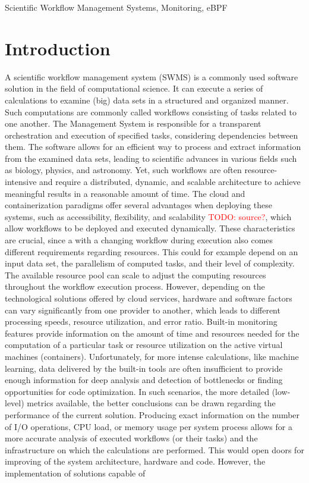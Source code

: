 \documentclass[a4paper,journal]{IEEEtran}
\newcommand{\todo}[1]{\textcolor{red}{TODO: #1}\PackageWarning{TODO:}{#1!}}
\begin{document}
	\begin{IEEEkeywords}
		Scientific Workflow Management Systems, Monitoring, eBPF
	\end{IEEEkeywords}
	
	
	\section{Introduction}
	A scientific workflow management system (SWMS) is a commonly used software solution in the field of computational science. It can execute a series of calculations to examine (big) data sets in a structured and organized manner. Such computations are commonly called workflows consisting of tasks related to one another. The Management System is responsible for a transparent orchestration and execution of specified tasks, considering dependencies between them. The software allows for an efficient way to process and extract information from the examined data sets, leading to scientific advances in various fields such as biology, physics, and astronomy\cite{gil2007examiningchallengesscientific}. Yet, such workflows are often resource-intensive and require a distributed, dynamic, and scalable architecture to achieve meaningful results in a reasonable amount of time. The cloud and containerization paradigms offer several advantages when deploying these systems, such as accessibility, flexibility, and scalability \todo{source?}, which allow workflows to be deployed and executed dynamically. These characteristics are crucial, since a with a changing workflow during execution also comes different requirements regarding resources. This could for example depend on an input data set, the parallelism of computed tasks, and their level of complexity. The available resource pool can scale to adjust the computing resources throughout the workflow execution process. However, depending on the technological solutions offered by cloud services, hardware and software factors can vary significantly from one provider to another, which leads to different processing speeds, resource utilization, and error ratio\cite{aljamal2018comparativereviewhighperformance}. Built-in monitoring features provide information on the amount of time and resources needed for the computation of a particular task or resource utilization on the active virtual machines (containers). Unfortunately, for more intense calculations, like machine learning, data delivered by the built-in tools are often insufficient to provide enough information for deep analysis and detection of bottlenecks or finding opportunities for code optimization. In such scenarios, the more detailed (low-level) metrics available, the better conclusions can be drawn regarding the performance of the current solution. Producing exact information on the number of I/O operations, CPU load, or memory usage per system process allows for a more accurate analysis of executed workflows (or their tasks) and the infrastructure on which the calculations are performed. This would open doors for improving of the system architecture, hardware and code. However, the implementation of solutions capable of 
\end{document}
